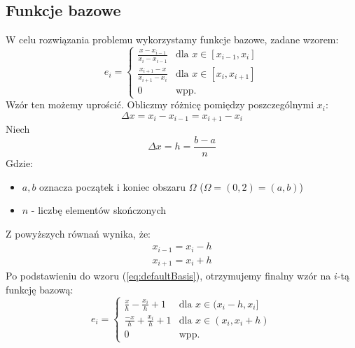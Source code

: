 \documentclass[12pt]{article}
\begin{document}
\subsection{Funkcje bazowe}
W celu rozwiązania problemu wykorzystamy funkcje bazowe, zadane wzorem:
\begin{equation} \label{eq:defaultBasis}
    e_i = \begin{cases}
        \frac{x - x_{i-1}}{x_i - x_{i-1}} & \text{dla } x \in [x_{i-1}, x_i] \\
        \frac{x_{i+1} - x}{x_{i+1} - x_i} & \text{dla } x \in [x_i, x_{i+1}] \\
        0 & \text{wpp.}
    \end{cases}
\end{equation}
% 
Wzór ten możemy uprościć. Obliczmy różnicę pomiędzy poszczególnymi $x_i$:
\begin{equation}
    \Delta x = x_i - x_{i-1} = x_{i+1} - x_i
\end{equation}
% 
Niech
\begin{equation}
    \Delta x = h = \frac{b - a}{n}
\end{equation}
Gdzie:
\begin{itemize}
    \item $a,b$ oznacza początek i koniec obszaru $\Omega$ ($\Omega = (0,2) = (a,b)$)
    \item $n$ - liczbę elementów skończonych
\end{itemize}
% 
Z powyższych równań wynika, że: 
\begin{gather}
    x_{i-1} = x_i - h \\
    x_{i+1} = x_i + h
\end{gather}
% 
Po podstawieniu do wzoru (\ref{eq:defaultBasis}), otrzymujemy finalny wzór na $i$-tą funkcję bazową:
\begin{equation}
    e_i = \begin{cases}
        \frac{x}{h} - \frac{x_i}{h} + 1 & \text{dla } x \in (x_i - h, x_i] \\
        \frac{-x}{h} + \frac{x_i}{h} + 1 & \text{dla } x \in (x_i, x_i+h) \\
        0 & \text{wpp.}
    \end{cases}
\end{equation}
\end{document}
